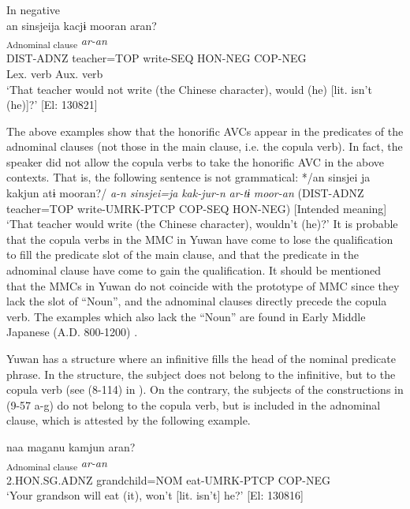 \ex  In negative\\
 \gllll  an  sinsjeija  kacjɨ  mooran  aran?\\
    [\textit{a-n}  \textit{sinsjei=ja}  \textit{kak-tɨ}  \textit{moor-an}]\textsubscript{Adnominal clause}  \textit{ar-an}\\
    DIST-ADNZ  teacher=TOP  write-SEQ  HON-NEG  COP-NEG\\
        Lex. verb  Aux. verb  \\
    \glt     ‘That teacher would not write (the Chinese character), would (he) [lit. isn’t (he)]?’ [El: 130821]
    \z
\z

The above examples show that the honorific AVCs appear in the predicates of the adnominal clauses (not those in the main clause, i.e. the copula verb). In fact, the speaker did not allow the copula verbs to take the honorific AVC in the above contexts. That is, the following sentence is not grammatical: */an sinsjei ja kakjun atɨ mooran?/ \textit{a-n} \textit{sinsjei=ja} \textit{kak-jur-n} \textit{ar-tɨ} \textit{moor{}-an} (DIST-ADNZ teacher=TOP write-UMRK-PTCP COP-SEQ HON{}-NEG) [Intended meaning] ‘That teacher would write (the Chinese character), wouldn’t (he)?’ It is probable that the copula verbs in the MMC in Yuwan have come to lose the qualification to fill the predicate slot of the main clause, and that the predicate in the adnominal clause have come to gain the qualification. It should be mentioned that the MMCs in Yuwan do not coincide with the prototype of MMC since they lack the slot of “Noun”, and the adnominal clauses directly precede the copula verb. The examples which also lack the “Noun” are found in Early Middle Japanese (A.D. 800-1200) \citep[203-205]{Miyachi2013}.

Yuwan has a structure where an infinitive fills the head of the nominal predicate phrase. In the structure, the subject does not belong to the infinitive, but to the copula verb (see (8-114) in ). On the contrary, the subjects of the constructions in (9-57 a-g) do not belong to the copula verb, but is included in the adnominal clause, which is attested by the following example.

\ea    \label{ex:9.59}
 \glll  naa  maganu  kamjun  aran?\\
    [\textit{naa}  \textit{maga=nu}  \textit{kam-jur-n}]\textsubscript{Adnominal clause}  \textit{ar-an}\\
    2.HON.SG.ADNZ  grandchild=NOM  eat-UMRK-PTCP  COP-NEG\\
    \glt     ‘Your grandson will eat (it), won’t [lit. isn’t] he?’ [El: 130816]
\z

